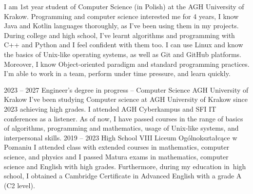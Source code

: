 \documentclass[8pt]{developercv} %
\begin{document}
\begin{minipage}[t]{0.5\textwidth} %
  \vspace{-\baselineskip}  %
  I am 1st year student of Computer Science (in Polish) at the AGH University of Krakow.
  Programming and computer science interested me for 4 years,
  I know Java and Kotlin languages thoroughly, as I’ve been using them in my projects.
  During college and high school, I’ve learnt algorithms and programming with C++ and Python and I feel confident with them too.
  I can use Linux and know the basics of Unix-like operating systems, as well as Git and GitHub platforms.
  Moreover, I know Object-oriented paradigm and standard programming practices.
  I’m able to work in a team, perform under time pressure, and learn quickly.
\end{minipage}
\hfill %
\begin{minipage}[t]{0.45\textwidth} %
	\vspace{-\baselineskip}
	\begin{barchart}{5.5}
	\end{barchart}
\end{minipage}





\begin{entrylist}
  \entry
    {2023 -- 2027}
    {Engineer's degree in progress -- Computer Science}
    {AGH University of Krakow}
    {
      I've been studying Computer science at AGH University of Krakow since 2023 achieving high grades.
      I attended AGH Cyberkampus and SFI IT conferences as a listener.
      As of now, I have passed courses in the range of basics of algorithms, programming and mathematics, usage of Unix-like systems, and interpersonal skills.
    }
  \entry
    {2019 -- 2023}
    {High School}
    {VIII Liceum Ogólnokształcące w Poznaniu}
    {
      I attended class with extended courses in mathematics, computer science, and physics and I passed Matura exams in mathematics, computer science and English with high grades.
      Furthermore, during my education in~high school, I obtained a Cambridge Certificate in Advanced English with a grade A (C2 level).
    }
\end{entrylist}
\end{document}
